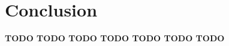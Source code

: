 
\chapter{Conclusion} %

\label{chapter:ContributionConclusion} %



\textbf{TODO TODO TODO TODO TODO TODO TODO }

